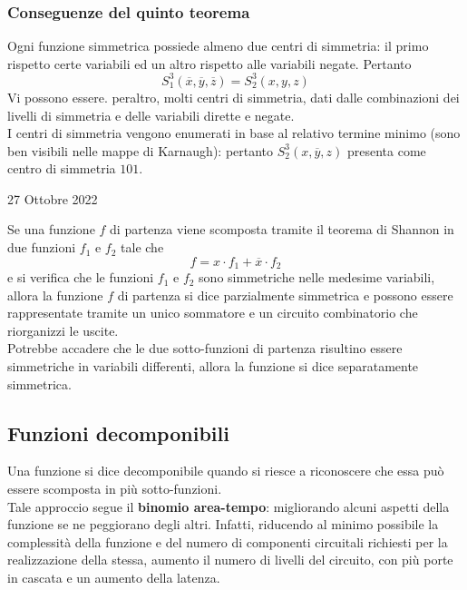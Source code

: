 \documentclass[a4paper]{extarticle}
\begin{document}
\subsubsection{Conseguenze del quinto teorema}
Ogni funzione simmetrica possiede almeno due centri di simmetria: il primo rispetto certe variabili ed un altro rispetto alle
variabili negate. Pertanto
\[S^3_1(\overline{x},\overline{y},\overline{z}) = S^3_2(x,y,z)\]
Vi possono essere. peraltro, molti centri di simmetria, dati dalle combinazioni dei livelli di simmetria e delle variabili dirette e negate.\\
I centri di simmetria vengono enumerati in base al relativo termine minimo (sono ben visibili nelle mappe di Karnaugh): pertanto $S^3_2(x,\overline{y},z)$ presenta come centro di simmetria $101$.





\newpage
\begin{center}
    27 Ottobre 2022
\end{center}
Se una funzione $f$ di partenza viene scomposta tramite il teorema di Shannon in due funzioni $f_1$ e $f_2$ tale che
\[f=x \cdot f_1 + \overline{x} \cdot f_2\]
e si verifica che le funzioni $f_1$ e $f_2$ sono simmetriche nelle medesime variabili, allora la funzione $f$ di partenza si dice parzialmente simmetrica e possono essere rappresentate tramite un unico sommatore e un circuito combinatorio che riorganizzi le uscite.\\
Potrebbe accadere che le due sotto-funzioni di partenza risultino essere simmetriche in variabili differenti, allora la funzione si dice separatamente simmetrica.

\vspace{1em}
\noindent
\subsection{Funzioni decomponibili}
Una funzione si dice decomponibile quando si riesce a riconoscere che essa può essere scomposta in più sotto-funzioni.\\
Tale approccio segue il \textbf{binomio area-tempo}: migliorando alcuni aspetti della funzione se ne peggiorano degli altri. Infatti, riducendo al minimo possibile la complessità della funzione e del numero di componenti circuitali richiesti per la realizzazione della stessa, aumento il numero di livelli del circuito, con più porte in cascata e un aumento della latenza.
\end{document}
